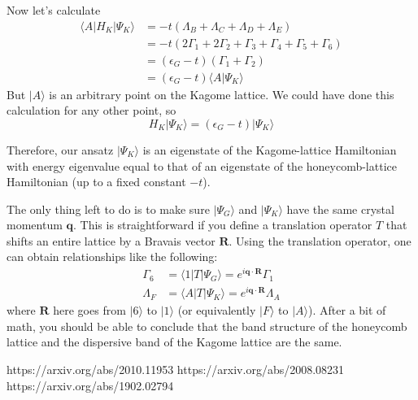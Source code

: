\documentclass[a4paper,12pt]{article}
\begin{document}
Now let's calculate
\begin{align}
\langle A | H_K | \Psi_K \rangle &= -t (\Lambda_B + \Lambda_C + \Lambda_D + \Lambda_E) \\
&= -t (2 \Gamma_1 + 2 \Gamma_2 + \Gamma_3 + \Gamma_4 + \Gamma_5 + \Gamma_6 )\\
&= (\epsilon_G - t)(\Gamma_1 + \Gamma_2) \\
&= (\epsilon_G - t) \langle A | \Psi_K \rangle 
\end{align}
But $| A \rangle$ is an arbitrary point on the Kagome lattice.  We could have done this calculation for any other point, so
\begin{equation}
H_K | \Psi_K \rangle = (\epsilon_G - t)  | \Psi_K \rangle
\end{equation}

Therefore, our ansatz $| \Psi_K \rangle$ is an eigenstate of the Kagome-lattice Hamiltonian with energy eigenvalue equal to that of an eigenstate of the honeycomb-lattice Hamiltonian (up to a fixed constant $-t$).

The only thing left to do is to make sure $| \Psi_G \rangle$ and $| \Psi_K \rangle$ have the same crystal momentum $\mathbf{q}$.  This is straightforward if you define a translation operator $T$ that shifts an entire lattice by a Bravais vector $\mathbf{R}$.  Using the translation operator, one can obtain relationships like the following:
\begin{align}
\Gamma_6 &= \langle 1 | T | \Psi_G \rangle = e^{i \mathbf{q} \cdot \mathbf{R}} \Gamma_1 \\
\Lambda_F &= \langle A | T | \Psi_K \rangle = e^{i \mathbf{q} \cdot \mathbf{R}} \Lambda_A
\end{align}
where $\mathbf{R}$ here goes from $| 6 \rangle$ to $| 1 \rangle$ (or equivalently $| F \rangle$ to $| A \rangle$).  After a bit of math, you should be able to conclude that the band structure of the honeycomb lattice and the dispersive band of the Kagome lattice are the same.

\begin{thebibliography}{1}

\singlespacing
\footnotesize

 https://arxiv.org/abs/2010.11953
 https://arxiv.org/abs/2008.08231
 https://arxiv.org/abs/1902.02794

\end{thebibliography}
\end{document}
